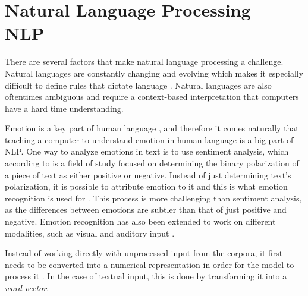 \documentclass[nofilelist]{cslthse-msc}
\begin{document}











\section{Natural Language Processing -- NLP}
\label{sect:nlp}
There are several factors that make natural language processing a challenge. Natural languages are constantly changing and evolving which makes it especially difficult to define rules that dictate language \citep{neuralnetworkmethods}. Natural languages are also oftentimes ambiguous and require a context-based interpretation that computers have a hard time understanding. 


Emotion is a key part of human language \citep{languageEmotion}, and therefore it comes naturally that teaching a computer to understand emotion in human language is a big part of NLP. One way to analyze emotions in text is to use sentiment analysis, which according to \citet{sentimentDefinition} is a field of study focused on determining the binary polarization of a piece of text as either positive or negative. 
Instead of just determining text's polarization, it is possible to attribute emotion to it and this is what emotion recognition is used for \citep{introToEmoRec}. This process is more challenging than sentiment analysis, as the differences between emotions are subtler than that of just positive and negative. 
Emotion recognition has also been extended to work on different modalities, such as visual and auditory input \citep{singh2020emotion}.

Instead of working directly with unprocessed input from the corpora, it first needs to be converted into a numerical representation in order for the model to process it \citep{franoischollet2017learning}. In the case of textual input, this is done by transforming it into a \textit{word vector}.
\end{document}
